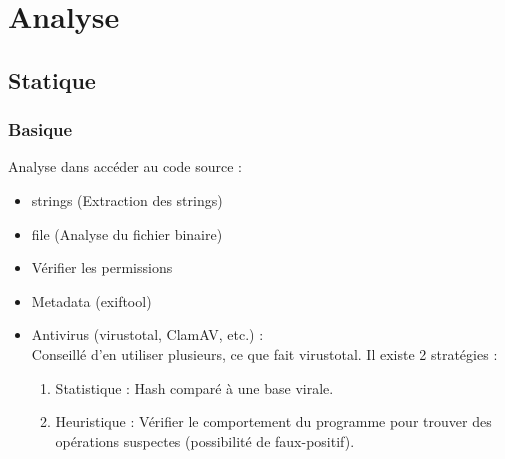 \documentclass[a4paper]{article}
\begin{document}
\newpage
\section{Analyse}
\subsection{Statique}
\subsubsection{Basique}
Analyse dans accéder au code source :
\begin{itemize}[label = \textbullet, font = \Large]
    \item strings (Extraction des strings)
    \item file (Analyse du fichier binaire)
    \item Vérifier les permissions
    \item Metadata (exiftool)
    \item Antivirus (virustotal, ClamAV, etc.) :\\
    Conseillé d'en utiliser plusieurs, ce que fait virustotal. Il existe 2 stratégies :
    \begin{enumerate}
        \item Statistique : Hash comparé à une base virale.
        \item Heuristique : Vérifier le comportement du programme pour trouver des opérations suspectes (possibilité de faux-positif).
    \end{enumerate}
\end{itemize}
\end{document}
